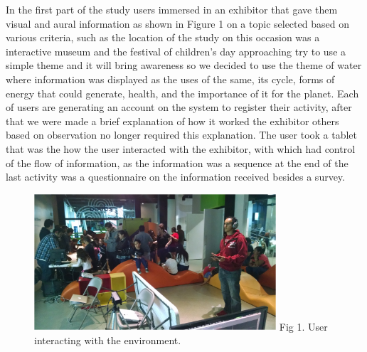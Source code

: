 \documentclass[journal]{IEEEtran}
\begin{document}

In the first part of the study users immersed in an exhibitor that gave them visual and aural information as shown in Figure 1 on a topic selected based on various criteria, such as the location of the study on this occasion was a interactive museum and the festival of children's day approaching try to use a simple theme and it will bring awareness so we decided to use the theme of water where information was displayed as the uses of the same, its cycle, forms of energy that could generate, health, and the importance of it for the planet. Each of users are generating an account on the system to register their activity, after that we were made a brief explanation of how it worked the exhibitor others based on observation no longer required this explanation. The user took a tablet that was the how the user interacted with the exhibitor, with which had control of the flow of information, as the information was a sequence at the end of the last activity was a questionnaire on the information received besides a survey.

\begin{figure}[ht]
	\centering
	\includegraphics [width=90mm] {tromp.PNG}
	\label{fig:Figure 1}
	Fig 1. User interacting with the environment.
\end{figure}
\end{document}
